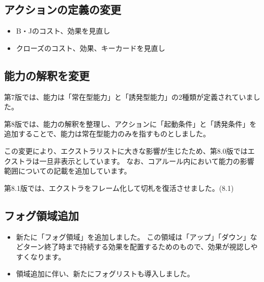 \documentclass[letterpaper,10pt,dvipdfmx]{sphinxmanual}
\begin{document}
\subsection{アクションの定義の変更}
\label{\detokenize{revision-history/8th:id2}}\begin{itemize}
\item {} 
\sphinxAtStartPar
B・Jのコスト、効果を見直し

\item {} 
\sphinxAtStartPar
クローズのコスト、効果、キーカードを見直し

\end{itemize}


\subsection{能力の解釈を変更}
\label{\detokenize{revision-history/8th:id3}}
\sphinxAtStartPar
第7版では、能力は「常在型能力」と「誘発型能力」の2種類が定義されていました。

\sphinxAtStartPar
第8版では、能力の解釈を整理し、アクションに「起動条件」と「誘発条件」を追加することで、能力は常在型能力のみを指すものとしました。

\sphinxAtStartPar
この変更により、エクストラリストに大きな影響が生じたため、第8.0版ではエクストラは一旦非表示としています。 なお、コアルール内において能力の影響範囲についての記載を追加しています。

\sphinxAtStartPar
第8.1版では、エクストラをフレーム化して切札を復活させました。(8.1)


\subsection{フォグ領域追加}
\label{\detokenize{revision-history/8th:id4}}\begin{itemize}
\item {} 
\sphinxAtStartPar
新たに「フォグ領域」を追加しました。
この領域は「アップ」「ダウン」などターン終了時まで持続する効果を配置するためのもので、効果が視認しやすくなります。

\item {} 
\sphinxAtStartPar
領域追加に伴い、新たにフォグリストも導入しました。

\end{itemize}
\end{document}
